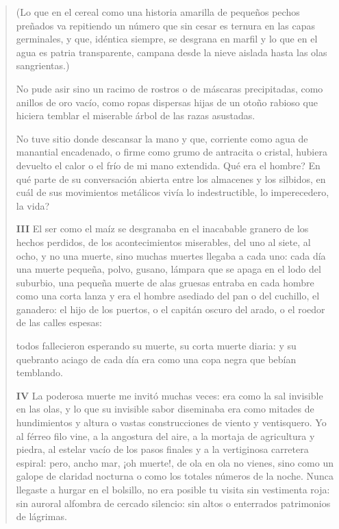\documentclass[12pt]{article}
\begin{document}
\begin{verse}
(Lo que en el cereal como una historia amarilla  
de pequeños pechos preñados va repitiendo un número  
que sin cesar es ternura en las capas germinales,  
y que, idéntica siempre, se desgrana en marfil  
y lo que en el agua es patria transparente, campana  
desde la nieve aislada hasta las olas sangrientas.)  
	
No pude asir sino un racimo de rostros o de máscaras  
precipitadas, como anillos de oro vacío,  
como ropas dispersas hijas de un otoño rabioso  
que hiciera temblar el miserable árbol de las razas asustadas.  
	
No tuve sitio donde descansar la mano  
y que, corriente como agua de manantial encadenado,  
o firme como grumo de antracita o cristal,  
hubiera devuelto el calor o el frío de mi mano extendida.  
Qué era el hombre? En qué parte de su conversación abierta  
entre los almacenes y los silbidos, en cuál de sus movimientos metálicos  
vivía lo indestructible, lo imperecedero, la vida?  

\textbf{ III}
El ser como el maíz se desgranaba en el inacabable  
granero de los hechos perdidos, de los acontecimientos  
miserables, del uno al siete, al ocho,  
y no una muerte, sino muchas muertes llegaba a cada uno:  
cada día una muerte pequeña, polvo, gusano, lámpara  
que se apaga en el lodo del suburbio, una pequeña muerte de alas gruesas  
entraba en cada hombre como una corta lanza  
y era el hombre asediado del pan o del cuchillo,  
el ganadero: el hijo de los puertos, o el capitán oscuro del arado,  
o el roedor de las calles espesas:  
	
todos fallecieron esperando su muerte, su corta muerte diaria:  
y su quebranto aciago de cada día era  
como una copa negra que bebían temblando.  

\textbf{ IV}
La poderosa muerte me invitó muchas veces:  
era como la sal invisible en las olas,  
y lo que su invisible sabor diseminaba  
era como mitades de hundimientos y altura  
o vastas construcciones de viento y ventisquero.  
Yo al férreo filo vine, a la angostura  
del aire, a la mortaja de agricultura y piedra,  
al estelar vacío de los pasos finales  
y a la vertiginosa carretera espiral:  
pero, ancho mar, ¡oh muerte!, de ola en ola no vienes,  
sino como un galope de claridad nocturna  
o como los totales números de la noche.  
Nunca llegaste a hurgar en el bolsillo, no era  
posible tu visita sin vestimenta roja:  
sin auroral alfombra de cercado silencio:  
sin altos o enterrados patrimonios de lágrimas.  
	

\end{verse}
\end{document}
